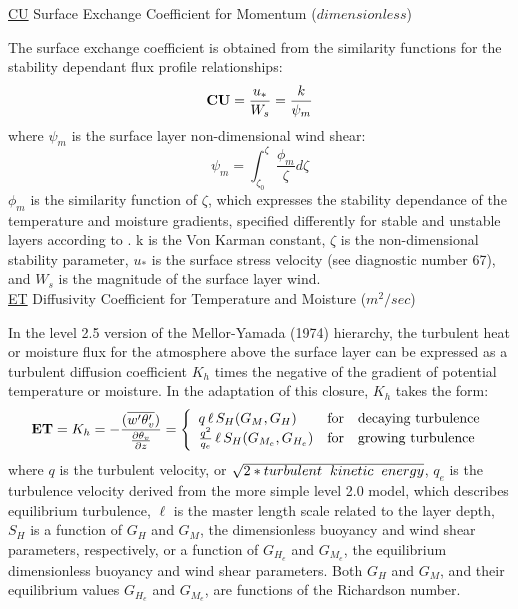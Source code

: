 \noindent
{ \underline {CU}  Surface Exchange Coefficient for Momentum ($dimensionless$) }

\noindent
The surface exchange coefficient is obtained from the similarity functions for the stability
 dependant flux profile relationships:
\[
{\bf CU} = \frac{u_* }{ W_s} = \frac{ k }{ \psi_{m} } 
\]
where $\psi_m$ is the surface layer non-dimensional wind shear: 
\[
\psi_{m} = {\int_{\zeta_{0}}^{\zeta} \frac{\phi_{m} }{ \zeta} d \zeta}
\]
\noindent
$\phi_m$ is the similarity function of $\zeta$, which expresses the stability dependance of
the temperature and moisture gradients, specified differently for stable and unstable layers
according to \cite{helfschu:95}. k is the Von Karman constant, $\zeta$ is the 
non-dimensional stability parameter, $u_*$ is the surface stress velocity 
(see diagnostic number 67), and $W_s$ is the magnitude of the surface layer wind.
\\

\noindent
{ \underline {ET}  Diffusivity Coefficient for Temperature and Moisture ($m^2/sec$) }

\noindent
In the level 2.5 version of the Mellor-Yamada (1974) hierarchy, the turbulent heat or
moisture flux for the atmosphere above the surface layer can be expressed as a turbulent 
diffusion coefficient $K_h$ times the negative of the gradient of potential temperature 
or moisture. In the \cite{helflab:88} adaptation of this closure, $K_h$ 
takes the form:
\[
{\bf ET} = K_h = -\frac{( \overline{w^{\prime}\theta_v^{\prime}}) }{ \pp{\theta_v}{z} } 
 = \left\{ \begin{array}{l@{\quad\mbox{for}\quad}l} q \, \ell \, S_H(G_M,G_H) & \mbox{decaying turbulence}
\\ \frac{ q^2 }{ q_e } \, \ell \, S_{H}(G_{M_e},G_{H_e}) & \mbox{growing turbulence} \end{array} \right.
\]
where $q$ is the turbulent velocity, or $\sqrt{2*turbulent \hspace{.2cm} kinetic \hspace{.2cm} 
energy}$, $q_e$ is the turbulence velocity derived from the more simple level 2.0 model, 
which describes equilibrium turbulence, $\ell$ is the master length scale related to the layer 
depth, 
$S_H$ is a function of $G_H$ and $G_M$, the dimensionless buoyancy and
wind shear parameters, respectively, or a function of $G_{H_e}$ and $G_{M_e}$, the equilibrium 
dimensionless buoyancy and wind shear
parameters.   Both $G_H$ and $G_M$, and their equilibrium values $G_{H_e}$ and $G_{M_e}$, 
are functions of the Richardson number.

